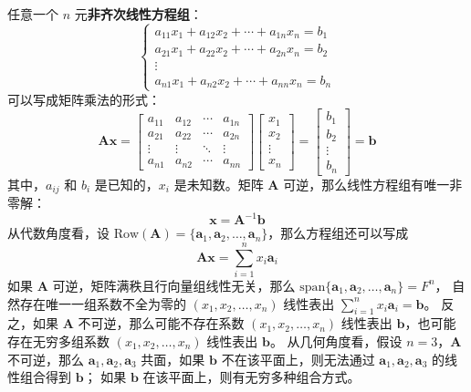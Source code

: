 任意一个 $n$ 元\textbf{非齐次线性方程组}：
\[
    \begin{cases}
        a_{11}x_1 + a_{12}x_2 + \cdots + a_{1n}x_n = b_1 \\
        a_{21}x_1 + a_{22}x_2 + \cdots + a_{2n}x_n = b_2 \\
        \vdots \\
        a_{n1}x_1 + a_{n2}x_2 + \cdots + a_{nn}x_n = b_n
    \end{cases}
\]
可以写成矩阵乘法的形式：
\[
    \mathbf{A}\mathbf{x} = \begin{bmatrix}
        a_{11} & a_{12} & \cdots & a_{1n} \\
        a_{21} & a_{22} & \cdots & a_{2n} \\
        \vdots & \vdots & \ddots & \vdots \\
        a_{n1} & a_{n2} & \cdots & a_{nn}
    \end{bmatrix}\begin{bmatrix}
        x_1 \\
        x_2 \\
        \vdots\\
        x_n
    \end{bmatrix}=
    \begin{bmatrix}
        b_1 \\
        b_2 \\
        \vdots\\
        b_n
    \end{bmatrix} = \mathbf{b}
\]
其中，$a_{ij}$ 和 $b_i$ 是已知的，$x_i$ 是未知数。矩阵 $\mathbf{A}$ 可逆，那么线性方程组有唯一非零解：
\[
    \mathbf{x} = \mathbf{A}^{-1}\mathbf{b}
\]
从代数角度看，设 $\mathrm{Row}(\mathbf{A}) = \{\mathbf{a}_1,\mathbf{a}_2,\ldots,\mathbf{a}_n\}$，那么方程组还可以写成
\[
    \mathbf{A}\mathbf{x} = \sum^n_{i=1}x_i\mathbf{a}_i
\]
如果 $\mathbf{A}$ 可逆，矩阵满秩且行向量组线性无关，那么 $\mathrm{span}\{\mathbf{a}_1,\mathbf{a}_2,\ldots,\mathbf{a}_n\} = F^n$，
自然存在唯一一组系数不全为零的 $(x_1,x_2,\ldots,x_n)$ 线性表出 $\sum^n_{i=1}x_i\mathbf{a}_i = \mathbf{b}$。
反之，如果 $\mathbf{A}$ 不可逆，那么可能不存在系数 $(x_1,x_2,\ldots,x_n)$ 线性表出 $\mathbf{b}$，也可能存在无穷多组系数 $(x_1,x_2,\ldots,x_n)$ 线性表出 $\mathbf{b}$。
从几何角度看，假设 $n=3$，$\mathbf{A}$ 不可逆，那么 $\mathbf{a}_1,\mathbf{a}_2,\mathbf{a}_3$ 共面，如果 $\mathbf{b}$ 不在该平面上，则无法通过 $\mathbf{a}_1,\mathbf{a}_2,\mathbf{a}_3$ 的线性组合得到 $\mathbf{b}$；
如果 $\mathbf{b}$ 在该平面上，则有无穷多种组合方式。
\vspace{1em}

